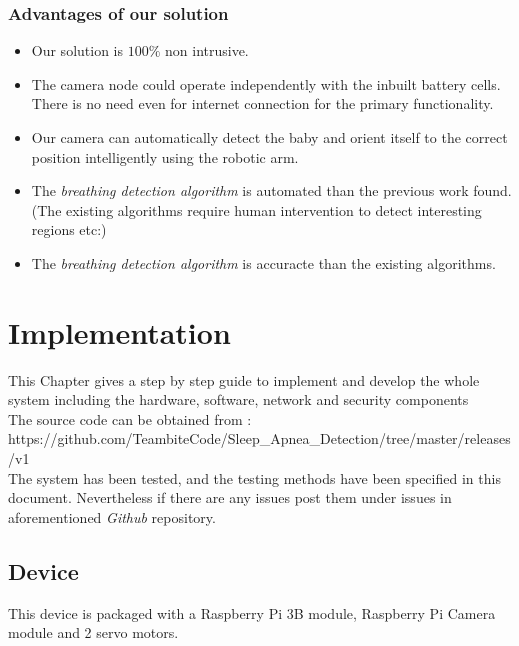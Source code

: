 \documentclass{report}
\begin{document}
\subsection{Advantages of our solution}
\begin{itemize}
    \item Our solution is $100\%$ non intrusive.
    \item The camera node could operate independently with the inbuilt battery cells. There is no need even for internet connection for the primary functionality.
    \item Our camera can automatically detect the baby and orient itself to the correct position intelligently using the robotic arm.
    \item The \textit{breathing detection algorithm} is automated than the previous work found. (The existing algorithms require human intervention to detect interesting regions etc:)
    \item The \textit{breathing detection algorithm} is accuracte than the existing algorithms.
    
\end{itemize}



\chapter{Implementation}

This Chapter gives a step by step guide to implement and develop the whole system including the hardware, software, network and security components\\
The source code can be obtained from : \\

https://github.com/TeambiteCode/Sleep\_Apnea\_Detection/tree/master/releases/v1\\

The system has been tested, and the testing methods have been specified in this document. Nevertheless if there are any issues post them under issues in aforementioned \emph{Github} repository.

\section{Device}

This device is packaged with a Raspberry Pi 3B module, Raspberry Pi Camera module and 2 servo motors. 
\end{document}
